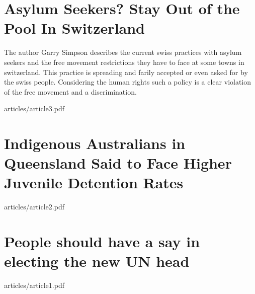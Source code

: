 \section{Asylum Seekers? Stay Out of the Pool In Switzerland}

The author Garry Simpson describes the current swiss practices with asylum
seekers and the free movement restrictions they have to face at some towns
in switzerland. This practice is spreading and farily accepted or even asked
for by the swiss people. Considering the human rights such a policy is a
clear violation of the free movement and a discrimination.


	{articles/article3.pdf}

\section{Indigenous Australians in Queensland Said to Face Higher Juvenile Detention Rates}

	{articles/article2.pdf}

\section{People should have a say in electing the new UN head}

	{articles/article1.pdf}



